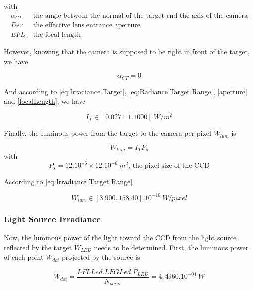 with
\begin{align*}
\alpha_{CT} & \mbox{ the angle between the normal of the target and the axis of the camera} \\
Dsr & \mbox{ the effective lens entrance aperture} \\
EFL & \mbox{ the focal length}
\end{align*}

However, knowing that the camera is supposed to be right in front of the target, we have

\begin{equation*}
\alpha_{CT} = 0
\end{equation*}

And according to \eqref{eq:Irradiance Target}, \eqref{eq:Radiance Target Range}, \ref{aperture} and \ref{focalLength}, we have

\begin{equation}
\label{eq:Irradiance Target Range}
I_T \in [0.0271, 1.1000] \ W/m^2
\end{equation}

Finally, the luminous power from the target to the camera per pixel $W_{lum}$ is 

\begin{equation}
\label{eq:Luminous Power}
W_{lum} = I_TP_s
\end{equation}
with
\begin{equation*}
P_s = 12.10^{-6}\times 12.10^{-6}\ m^2\mbox{, the pixel size of the CCD}
\end{equation*}

According to \eqref{eq:Irradiance Target Range}

\begin{equation}
\label{eq:Luminous Power Range}
W_{lum} \in [3.900, 158.40].10^{-10} \ W/pixel
\end{equation}





\subsubsection{Light Source Irradiance}
Now, the luminous power of the light toward the CCD from the light source reflected by the target $W_{LED}$ needs to be determined. First, the luminous power of each point $W_{dot}$ projected by the source is

\begin{equation}
\label{eq:powerpoint}
W_{dot} = \frac{LFLLed.LFGLed.P_{LED}}{N_{point}} = 4,4960.10^{-04}\ W
\end{equation}

